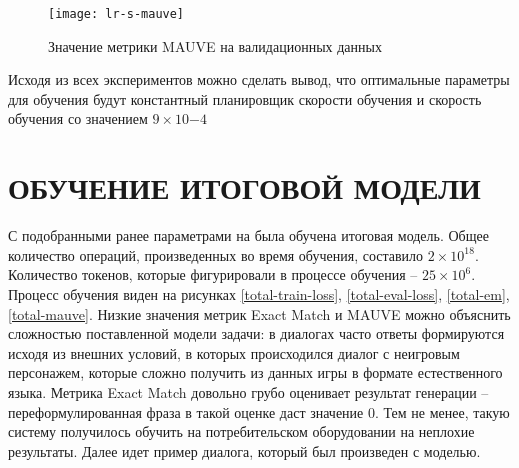 \begin{figure}[H]
  \centering
  \texttt{[image: lr-s-mauve]}
  \caption{Значение метрики MAUVE на валидационных данных}
  \label{lr-mauve}
\end{figure}

Исходя из всех экспериментов можно сделать вывод, что оптимальные параметры для обучения будут константный планировщик скорости обучения и скорость обучения со значением $9 \times 10{-4}$

\section{ОБУЧЕНИЕ ИТОГОВОЙ МОДЕЛИ}

С подобранными ранее параметрами на была обучена итоговая модель. Общее количество операций, произведенных во время обучения, составило $2 \times 10^{18}$. Количество токенов, которые фигурировали в процессе обучения -- $25 \times 10^{6}$. Процесс обучения виден на рисунках \ref{total-train-loss}, \ref{total-eval-loss}, \ref{total-em}, \ref{total-mauve}. Низкие значения метрик Exact Match и MAUVE можно объяснить сложностью поставленной модели задачи: в диалогах часто ответы формируются исходя из внешних условий, в которых происходился диалог с неигровым персонажем, которые сложно получить из данных игры в формате естественного языка. Метрика Exact Match довольно грубо оценивает результат генерации -- переформулированная фраза в такой оценке даст значение 0. Тем не менее, такую систему получилось обучить на потребительском оборудовании на неплохие результаты. Далее идет пример диалога, который был произведен с моделью.

